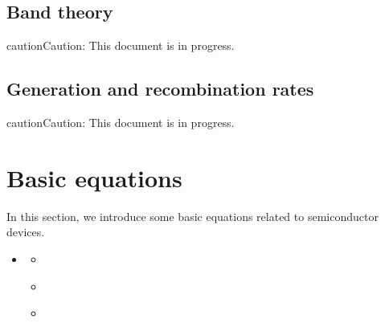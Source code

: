\documentclass[letterpaper,10pt,english]{sphinxmanual}
\numberwithin{equation}{section}
\begin{document}
\sphinxstepscope


\subsection{Band theory}
\label{\detokenize{band_theory:band-theory}}\label{\detokenize{band_theory::doc}}
\begin{sphinxadmonition}{caution}{Caution:}
\sphinxAtStartPar
This document is in progress.
\end{sphinxadmonition}

\sphinxstepscope


\subsection{Generation and recombination rates}
\label{\detokenize{Generation_and_recombination:generation-and-recombination-rates}}\label{\detokenize{Generation_and_recombination:generation-and-recombination}}\label{\detokenize{Generation_and_recombination::doc}}
\begin{sphinxadmonition}{caution}{Caution:}
\sphinxAtStartPar
This document is in progress.
\end{sphinxadmonition}

\sphinxstepscope


\section{Basic equations}
\label{\detokenize{Basic_equation:basic-equations}}\label{\detokenize{Basic_equation:basic-equation}}\label{\detokenize{Basic_equation::doc}}
\sphinxAtStartPar
In this section, we introduce some basic equations related to semiconductor devices.

\begin{sphinxShadowBox}
\begin{itemize}
\item {} 
\sphinxAtStartPar
{}\label{\detokenize{Basic_equation:id4}}{\hyperref[\detokenize{Basic_equation:basic-equations}]{}}
\begin{itemize}
\item {} 
\sphinxAtStartPar
{}\label{\detokenize{Basic_equation:id5}}{\hyperref[\detokenize{Basic_equation:poisson-equation}]{}}

\item {} 
\sphinxAtStartPar
{}\label{\detokenize{Basic_equation:id6}}{\hyperref[\detokenize{Basic_equation:current-density-equations}]{}}

\item {} 
\sphinxAtStartPar
{}\label{\detokenize{Basic_equation:id7}}{\hyperref[\detokenize{Basic_equation:continuity-equations}]{}}

\end{itemize}

\end{itemize}
\end{sphinxShadowBox}
\end{document}

